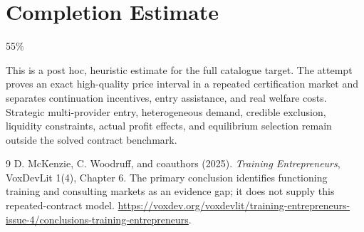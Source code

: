 \documentclass[11pt,a4paper]{article}
\begin{document}
\section{Completion Estimate}
55\%

This is a post hoc, heuristic estimate for the full catalogue target.
The attempt proves an exact high-quality price interval in a repeated certification market and separates continuation incentives, entry assistance, and real welfare costs. Strategic multi-provider entry, heterogeneous demand, credible exclusion, liquidity constraints, actual profit effects, and equilibrium selection remain outside the solved contract benchmark.

\begin{thebibliography}{9}
 D. McKenzie, C. Woodruff, and coauthors (2025).
\emph{Training Entrepreneurs}, VoxDevLit 1(4), Chapter 6.
The primary conclusion identifies functioning training and consulting markets as an evidence gap; it does not supply this repeated-contract model.
\url{https://voxdev.org/voxdevlit/training-entrepreneurs-issue-4/conclusions-training-entrepreneurs}.
\end{thebibliography}
\end{document}
